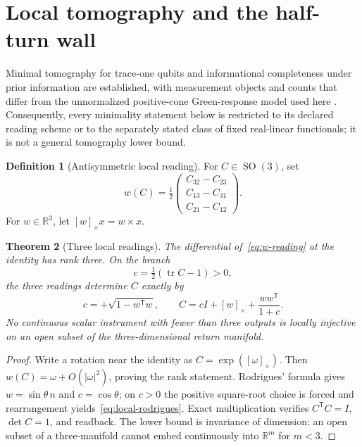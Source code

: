 \documentclass[12pt]{article}
\newtheorem{theorem}{Theorem}[section]
\theoremstyle{definition}
\newtheorem{definition}[theorem]{Definition}
\theoremstyle{remark}
\newcommand{\RR}{\mathbb R}
\newcommand{\SO}{\operatorname{SO}}
\newcommand{\tr}{\operatorname{tr}}
\begin{document}
\section{Local tomography and the half-turn wall}
\label{sec:local_tomography}

Minimal tomography for trace-one qubits and informational completeness under
prior information are established, with measurement objects and counts that
differ from the unnormalized positive-cone Green-response model used here
\cite{RehacekEtAl2004,HeinosaariMazzarellaWolf2013}.  Consequently, every
minimality statement below is restricted to its declared reading scheme or
to the separately stated class of fixed real-linear functionals; it is not a
general tomography lower bound.

\begin{definition}[Antisymmetric local reading]\label{def:local-reading}
For $C\in\SO(3)$, set
\begin{equation}\label{eq:w-reading}
 w(C)=\tfrac12
 \begin{pmatrix}
 C_{32}-C_{23}\\ C_{13}-C_{31}\\ C_{21}-C_{12}
 \end{pmatrix}.
\end{equation}
For $w\in\RR^3$, let $[w]_\times x=w\times x$.
\end{definition}

\begin{theorem}[Three local readings]\label{thm:local-three}
The differential of~\eqref{eq:w-reading} at the identity has rank three.
On the branch
\[
 c=\tfrac12(\tr C-1)>0,
\]
the three readings determine $C$ exactly by
\begin{equation}\label{eq:local-rodrigues}
 c=+\sqrt{1-w^\mathsf Tw},\qquad
 C=cI+[w]_\times+\frac{ww^\mathsf T}{1+c}.
\end{equation}
No continuous scalar instrument with fewer than three outputs is locally
injective on an open subset of the three-dimensional return manifold.
\end{theorem}

\begin{proof}
Write a rotation near the identity as
$C=\exp([\omega]_\times)$.  Then $w(C)=\omega+O(|\omega|^2)$, proving the
rank statement.  Rodrigues' formula gives
$w=\sin\theta\,n$ and $c=\cos\theta$; on $c>0$ the positive square-root
choice is forced and rearrangement yields~\eqref{eq:local-rodrigues}.
Exact multiplication verifies $C^\mathsf TC=I$, $\det C=1$, and readback.
The lower bound is invariance of dimension: an open subset of a
three-manifold cannot embed continuously into $\RR^m$ for $m<3$.
\end{proof}
\end{document}
